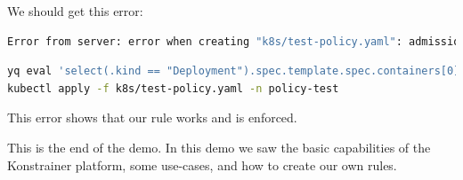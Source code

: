 We should get this error:

\begin{lstlisting}[caption={TODO},language=bash,label=code:todo]
Error from server: error when creating "k8s/test-policy.yaml": admission webhook "only-internal-registry.btieger.me" denied the request: All images must be from the company registry.
\end{lstlisting}

\begin{lstlisting}[caption={TODO},language=bash,label=code:bashx]
yq eval 'select(.kind == "Deployment").spec.template.spec.containers[0].image = "tiegris/apples-users"' k8s/test-policy.yaml -i
kubectl apply -f k8s/test-policy.yaml -n policy-test
\end{lstlisting}

This error shows that our rule works and is enforced.

This is the end of the demo. In this demo we saw the basic capabilities of the Konstrainer platform, some use-cases, and how to create our own rules.

